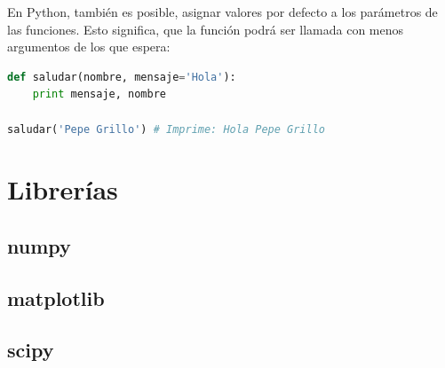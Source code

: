 \documentclass[a4paper, openright, 12pt]{article}
\begin{document}
    En Python, también es posible, asignar valores por defecto a los parámetros de las funciones. Esto significa, que la función podrá ser llamada con menos argumentos de los que espera:\\

\begin{lstlisting}[language=Python]
def saludar(nombre, mensaje='Hola'):
    print mensaje, nombre

saludar('Pepe Grillo') # Imprime: Hola Pepe Grillo
\end{lstlisting}

    \newpage{}


  \section{Librerías}
    \subsection{numpy}
    \subsection{matplotlib}
    \subsection{scipy}
\end{document}
